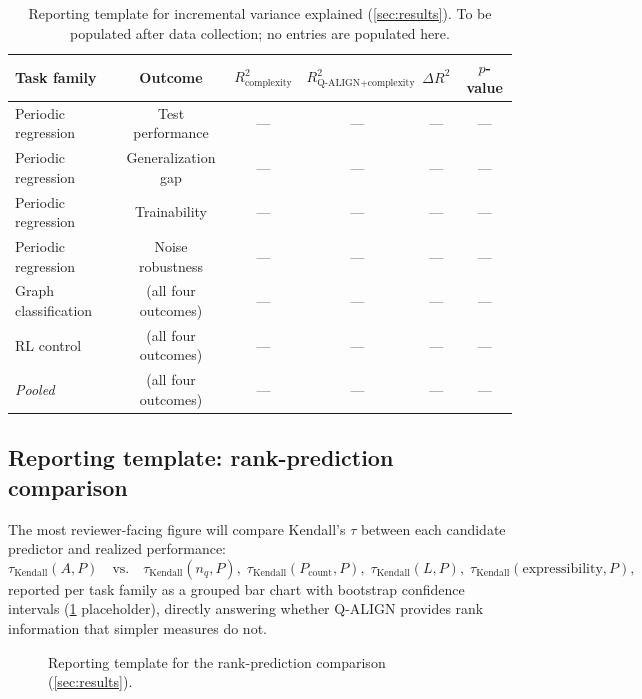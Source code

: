 \documentclass[11pt]{article}
\begin{document}
\begin{table}[htbp]
\centering
\caption{Reporting template for incremental variance explained (\cref{sec:results}). To be populated after data collection; no entries are populated here.}
\label{tab:results-template-r2}
\begin{tabular}{@{}lccccc@{}}
\toprule
Task family & Outcome & $R^2_{\text{complexity}}$ & $R^2_{\text{Q-ALIGN+complexity}}$ & $\Delta R^2$ & $p$-value \\
\midrule
Periodic regression & Test performance & --- & --- & --- & --- \\
Periodic regression & Generalization gap & --- & --- & --- & --- \\
Periodic regression & Trainability & --- & --- & --- & --- \\
Periodic regression & Noise robustness & --- & --- & --- & --- \\
Graph classification & (all four outcomes) & --- & --- & --- & --- \\
RL control & (all four outcomes) & --- & --- & --- & --- \\
\textit{Pooled} & (all four outcomes) & --- & --- & --- & --- \\
\bottomrule
\end{tabular}
\end{table}

\subsection{Reporting template: rank-prediction comparison}
The most reviewer-facing figure will compare Kendall's $\tau$ between each candidate predictor and realized performance:
\[
    \tau_{\mathrm{Kendall}}(A, P) \quad \text{vs.} \quad \tau_{\mathrm{Kendall}}(n_q, P),\; \tau_{\mathrm{Kendall}}(P_{\text{count}}, P),\; \tau_{\mathrm{Kendall}}(L, P),\; \tau_{\mathrm{Kendall}}(\text{expressibility}, P),
\]
reported per task family as a grouped bar chart with bootstrap confidence intervals (\cref{fig:results-template-tau} placeholder), directly answering whether Q-ALIGN provides rank information that simpler measures do not.

\begin{figure}[htbp]
\centering
{}
\caption{Reporting template for the rank-prediction comparison (\cref{sec:results}).}
\label{fig:results-template-tau}
\end{figure}
\end{document}
